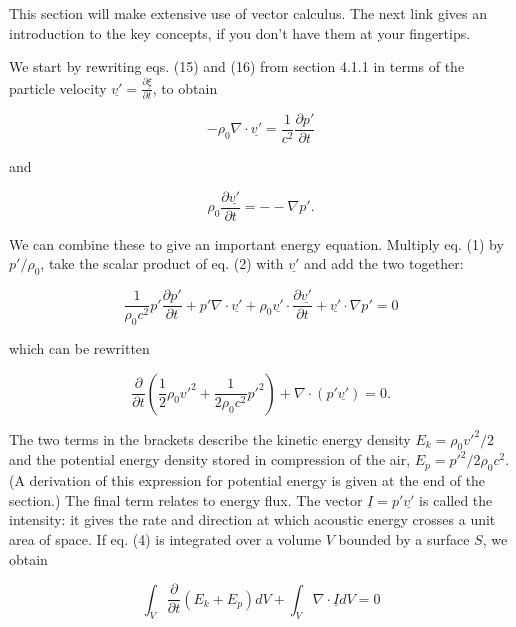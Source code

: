   This section will make extensive use of vector calculus. The next link gives 
  an introduction to the key concepts, if you don't have them at your 
  fingertips. 

  We start by rewriting eqs. (15) and (16) from section 4.1.1 in terms of the 
  particle velocity $\underline{v'}=\frac{\partial \underline{\xi}}{\partial 
  t}$, to obtain 

  \begin{equation*}-\rho_0 \nabla \cdot \underline{v'} = \frac{1}{c^2} 
  \frac{\partial p'}{\partial t} \tag{1}\end{equation*} 

  \noindent{}and 

  \begin{equation*}\rho_0 \frac{\partial \underline{v'}}{\partial t} = -- 
  \nabla p' . \tag{2}\end{equation*} 

  We can combine these to give an important energy equation. Multiply eq. (1) 
  by $p'/\rho_0$, take the scalar product of eq. (2) with $\underline{v'}$ and 
  add the two together: 

  \begin{equation*}\dfrac{1}{\rho_0 c^2} p' \dfrac{\partial p'}{\partial t} + 
  p' \nabla \cdot \underline{v'} + \rho_0 \underline{v'} \cdot \dfrac{\partial 
  \underline{v'}}{\partial t} + \underline{v'} \cdot \nabla p' = 0 
  \tag{3}\end{equation*} 

  \noindent{}which can be rewritten 

  \begin{equation*}\dfrac{\partial}{\partial t} \left( \dfrac{1}{2} \rho_0 v'^2 
  + \dfrac{1}{2 \rho_0 c^2} p'^2 \right) + \nabla \cdot (p' \underline{v'}) = 0 
  . \tag{4}\end{equation*} 

  The two terms in the brackets describe the kinetic energy density $E_k=\rho_0 
  v'^2/2$ and the potential energy density stored in compression of the air, 
  $E_p=p'^2/2 \rho_0 c^2$. (A derivation of this expression for potential 
  energy is given at the end of the section.) The final term relates to energy 
  flux. The vector $\underline{I}=p' \underline{v'}$ is called the intensity: 
  it gives the rate and direction at which acoustic energy crosses a unit area 
  of space. If eq. (4) is integrated over a volume $V$ bounded by a surface 
  $S$, we obtain 

  \begin{equation*}\int_V{\dfrac{\partial}{\partial t} (E_k+E_p) dV} + 
  \int_V{\nabla \cdot \underline{I} dV}=0 \tag{5}\end{equation*} 

